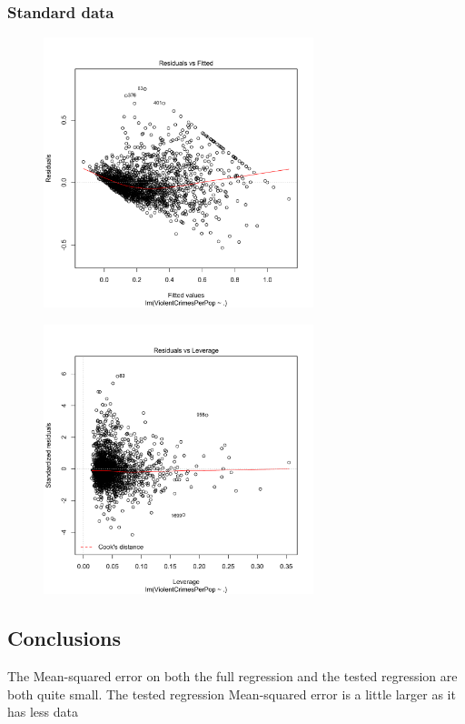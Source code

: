 \documentclass[12pt,a4paper]{article}
\begin{document}
\begin{singlespace}
\subsubsection{Standard data}
\vspace{-0.5cm}
\begin{figure}[h!]
    \centering
    \includegraphics[width=0.7\textwidth,trim= 0 0 20 30, clip]{Linear_regression_residuals.pdf}
\end{figure}


\vspace{-0.5cm}
\begin{figure}[h!]
    \centering
    \includegraphics[width=0.7\textwidth,trim= 0 0 20 30, clip]{Linear_regression_cook.pdf}
\end{figure}
\FloatBarrier
\subsection{Conclusions}
The Mean-squared error on both the full regression 
and the tested regression are both quite small. 
The tested regression Mean-squared error is a little larger as it has less data


\end{singlespace}
\end{document}
